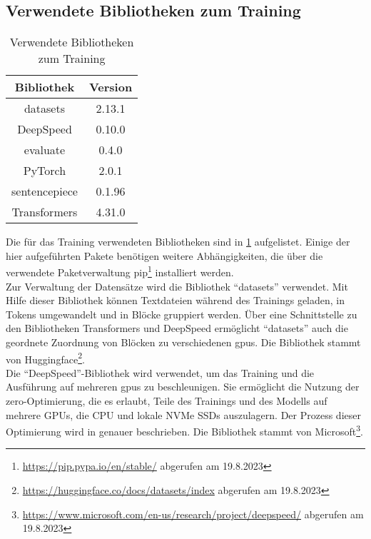 \subsection{Verwendete Bibliotheken zum Training}
\begin{table}
    \centering
    \begin{tabular}{cc}
        \toprule
        \textbf{Bibliothek} & \textbf{Version} \\
        \midrule
        datasets & 2.13.1 \\
        DeepSpeed & 0.10.0 \\
        evaluate & 0.4.0 \\
        PyTorch & 2.0.1 \\
        sentencepiece & 0.1.96 \\
        Transformers & 4.31.0 \\
        \bottomrule
    \end{tabular}
    \caption{Verwendete Bibliotheken zum Training}
    \label{tab:training-libraries}
\end{table}
Die für das Training verwendeten Bibliotheken sind in \cref{tab:training-libraries} aufgelistet.
Einige der hier aufgeführten Pakete benötigen weitere Abhängigkeiten, die über die verwendete Paketverwaltung \ac{pip}\footnote{\url{https://pip.pypa.io/en/stable/} abgerufen am 19.8.2023} installiert werden.\\

Zur Verwaltung der Datensätze wird die Bibliothek \enquote{datasets} verwendet.
Mit Hilfe dieser Bibliothek können Textdateien während des Trainings geladen, in Tokens umgewandelt und in Blöcke gruppiert werden.
Über eine Schnittstelle zu den Bibliotheken Transformers und DeepSpeed ermöglicht \enquote{datasets} auch die geordnete Zuordnung von Blöcken zu verschiedenen \ac{gpu}s.
Die Bibliothek stammt von Huggingface\footnote{\url{https://huggingface.co/docs/datasets/index} abgerufen am 19.8.2023}.\\

Die \enquote{DeepSpeed}-Bibliothek wird verwendet, um das Training und die Ausführung auf mehreren \ac{gpu}s zu beschleunigen.
Sie ermöglicht die Nutzung der \ac{zero}-Optimierung, die es erlaubt, Teile des Trainings und des Modells auf mehrere GPUs, die CPU und lokale NVMe SSDs auszulagern.
Der Prozess dieser Optimierung wird in \citet{deepspeed} genauer beschrieben.
Die Bibliothek stammt von Microsoft\footnote{\url{https://www.microsoft.com/en-us/research/project/deepspeed/} abgerufen am 19.8.2023}.\\

